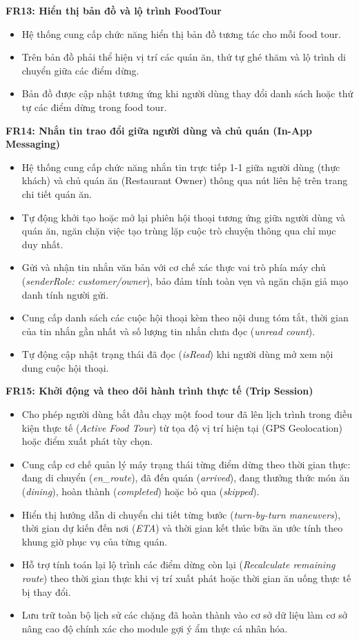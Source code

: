 \textbf{FR13: Hiển thị bản đồ và lộ trình FoodTour} 
\begin{itemize}[label=\textbullet]
    \item Hệ thống cung cấp chức năng hiển thị bản đồ tương tác cho mỗi food tour.
    \item Trên bản đồ phải thể hiện vị trí các quán ăn, thứ tự ghé thăm và lộ trình di chuyển giữa các
điểm dừng.
    \item Bản đồ được cập nhật tương ứng khi người dùng thay đổi danh sách hoặc thứ tự các điểm
dừng trong food tour.
\end{itemize}

\textbf{FR14: Nhắn tin trao đổi giữa người dùng và chủ quán (In-App Messaging)} 
\begin{itemize}[label=\textbullet]
    \item Hệ thống cung cấp chức năng nhắn tin trực tiếp 1-1 giữa người dùng (thực khách) và chủ quán ăn (Restaurant Owner) thông qua nút liên hệ trên trang chi tiết quán ăn.
    \item Tự động khởi tạo hoặc mở lại phiên hội thoại tương ứng giữa người dùng và quán ăn, ngăn chặn việc tạo trùng lặp cuộc trò chuyện thông qua chỉ mục duy nhất.
    \item Gửi và nhận tin nhắn văn bản với cơ chế xác thực vai trò phía máy chủ (\textit{senderRole: customer/owner}), bảo đảm tính toàn vẹn và ngăn chặn giả mạo danh tính người gửi.
    \item Cung cấp danh sách các cuộc hội thoại kèm theo nội dung tóm tắt, thời gian của tin nhắn gần nhất và số lượng tin nhắn chưa đọc (\textit{unread count}).
    \item Tự động cập nhật trạng thái đã đọc (\textit{isRead}) khi người dùng mở xem nội dung cuộc hội thoại.
\end{itemize}

\textbf{FR15: Khởi động và theo dõi hành trình thực tế (Trip Session)} 
\begin{itemize}[label=\textbullet]
    \item Cho phép người dùng bắt đầu chạy một food tour đã lên lịch trình trong điều kiện thực tế (\textit{Active Food Tour}) từ tọa độ vị trí hiện tại (GPS Geolocation) hoặc điểm xuất phát tùy chọn.
    \item Cung cấp cơ chế quản lý máy trạng thái từng điểm dừng theo thời gian thực: đang di chuyển (\textit{en\_route}), đã đến quán (\textit{arrived}), đang thưởng thức món ăn (\textit{dining}), hoàn thành (\textit{completed}) hoặc bỏ qua (\textit{skipped}).
    \item Hiển thị hướng dẫn di chuyển chi tiết từng bước (\textit{turn-by-turn maneuvers}), thời gian dự kiến đến nơi (\textit{ETA}) và thời gian kết thúc bữa ăn ước tính theo khung giờ phục vụ của từng quán.
    \item Hỗ trợ tính toán lại lộ trình các điểm dừng còn lại (\textit{Recalculate remaining route}) theo thời gian thực khi vị trí xuất phát hoặc thời gian ăn uống thực tế bị thay đổi.
    \item Lưu trữ toàn bộ lịch sử các chặng đã hoàn thành vào cơ sở dữ liệu làm cơ sở nâng cao độ chính xác cho module gợi ý ẩm thực cá nhân hóa.
\end{itemize}


